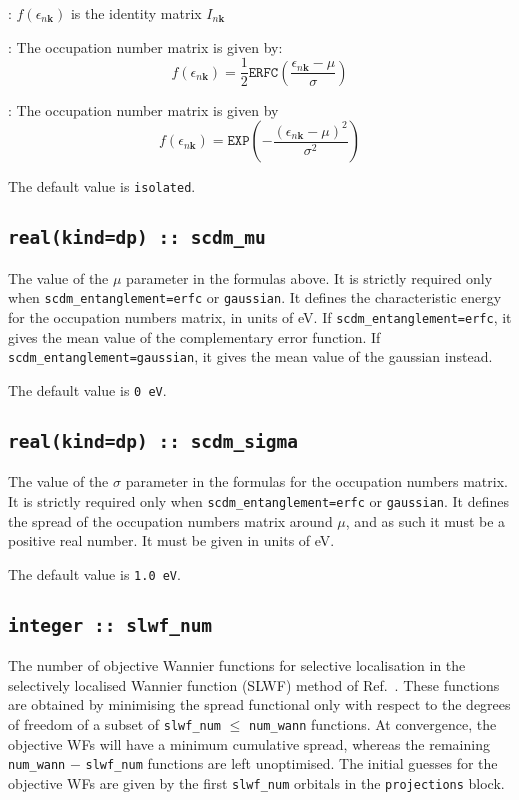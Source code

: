 : $f(\epsilon_{n\mathbf{k}})$ is the identity matrix $I_{n\mathbf{k}}$

: The occupation number matrix is given by: $$f(\epsilon_{n\mathbf{k}})=\frac{1}{2}\mathtt{ERFC}\left(\frac{\epsilon_{n\mathbf{k}} - \mu}{\sigma}\right) $$

: The occupation number matrix is given by $$f(\epsilon_{n\mathbf{k}})=\mathtt{EXP}\left(-\frac{(\epsilon_{n\mathbf{k}}-\mu)^2}{\sigma^2}\right)$$

The default value is {\tt isolated}.

\subsection[scdm\_mu]{\tt real(kind=dp) :: scdm\_mu}
The value of the $\mu$ parameter in the formulas above. It is strictly required only when {\tt scdm\_entanglement=erfc} or {\tt gaussian}. It defines the characteristic energy for the occupation numbers matrix, in units of eV. If {\tt scdm\_entanglement=erfc}, it gives the mean value of the complementary error function. If {\tt scdm\_entanglement=gaussian}, it gives the mean value of the gaussian instead.

The default value is {\tt 0 eV}.

\subsection[scdm\_sigma]{\tt real(kind=dp) :: scdm\_sigma}
The value of the $\sigma$ parameter in the formulas for the occupation numbers matrix. It is strictly required only when {\tt scdm\_entanglement=erfc} or {\tt gaussian}. It defines the spread of the occupation numbers matrix around $\mu$, and as such it must be a positive real number. It must be given in units of eV.

The default value is {\tt 1.0 eV}.

\subsection[slwf\_num]{\tt integer :: slwf\_num}
The number of objective Wannier functions for selective localisation in the selectively localised Wannier function (SLWF) method of Ref.~\cite{Marianetti}. These functions are obtained by minimising the spread functional only with respect to the degrees of freedom of a subset of {\tt slwf\_num} $\le$ {\tt num\_wann} functions. At convergence, the objective WFs will have a minimum cumulative spread, whereas the remaining {\tt num\_wann} $-$ {\tt slwf\_num} functions are left unoptimised. The initial guesses for the objective WFs are given by the first {\tt slwf\_num} orbitals in the {\tt projections} block. 

